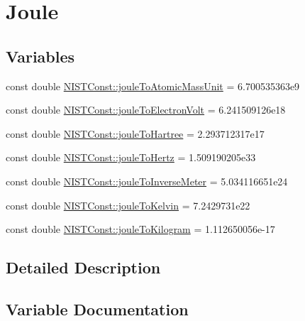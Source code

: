 \hypertarget{group___joule}{}\section{Joule}
\label{group___joule}
\subsection*{Variables}
\begin{DoxyCompactItemize}
\item 
const double \hyperlink{group___joule_ga6a8cba6b834ee62ab61671208b1ae9ee}{N\+I\+S\+T\+Const\+::joule\+To\+Atomic\+Mass\+Unit} = 6.\+700535363e9
\item 
const double \hyperlink{group___joule_ga08ffcdfd701ba898a91b0cbdde4d0e2d}{N\+I\+S\+T\+Const\+::joule\+To\+Electron\+Volt} = 6.\+241509126e18
\item 
const double \hyperlink{group___joule_gac067d2d31bf56c3abe63559dac6c00d7}{N\+I\+S\+T\+Const\+::joule\+To\+Hartree} = 2.\+293712317e17
\item 
const double \hyperlink{group___joule_ga6ac361417bc6b472bf80fcfef276d742}{N\+I\+S\+T\+Const\+::joule\+To\+Hertz} = 1.\+509190205e33
\item 
const double \hyperlink{group___joule_gaa8de9ad07a642c1b9c1d4ee15125a917}{N\+I\+S\+T\+Const\+::joule\+To\+Inverse\+Meter} = 5.\+034116651e24
\item 
const double \hyperlink{group___joule_ga506f23a4b88678bd7ee6f1067e97aa83}{N\+I\+S\+T\+Const\+::joule\+To\+Kelvin} = 7.\+2429731e22
\item 
const double \hyperlink{group___joule_ga250f161277a6e581e695dccb7c11d1fb}{N\+I\+S\+T\+Const\+::joule\+To\+Kilogram} = 1.\+112650056e-\/17
\end{DoxyCompactItemize}


\subsection{Detailed Description}


\subsection{Variable Documentation}
\mbox{\label{group___joule_ga6a8cba6b834ee62ab61671208b1ae9ee}} 
